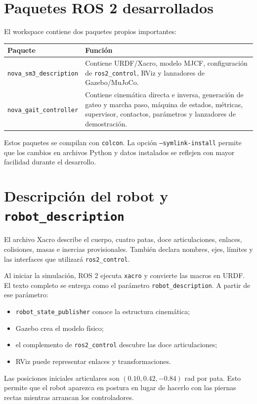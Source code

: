 \documentclass[11pt,a4paper]{article}
\begin{document}
\section{Paquetes ROS 2 desarrollados}
El workspace contiene dos paquetes propios importantes:
\begin{table}[h]
\centering
\begin{tabular}{p{}p{}}
\toprule
Paquete & Función\\
\midrule
\texttt{nova\_sm3\_description} & Contiene URDF/Xacro, modelo MJCF,
configuración de \texttt{ros2\_control}, RViz y lanzadores de Gazebo/MuJoCo.\\
\texttt{nova\_gait\_controller} & Contiene cinemática directa e inversa,
generación de gateo y marcha paso, máquina de estados, métricas, supervisor,
contactos, parámetros y lanzadores de demostración.\\
\bottomrule
\end{tabular}
\end{table}

Estos paquetes se compilan con \texttt{colcon}. La opción
\texttt{--symlink-install} permite que los cambios en archivos Python y datos
instalados se reflejen con mayor facilidad durante el desarrollo.

\section{Descripción del robot y \texttt{robot\_description}}
El archivo Xacro describe el cuerpo, cuatro patas, doce articulaciones, enlaces,
colisiones, masas e inercias provisionales. También declara nombres, ejes,
límites y las interfaces que utilizará \texttt{ros2\_control}.

Al iniciar la simulación, ROS 2 ejecuta \texttt{xacro} y convierte las macros en
URDF. El texto completo se entrega como el parámetro
\texttt{robot\_description}. A partir de ese parámetro:
\begin{itemize}
\item \texttt{robot\_state\_publisher} conoce la estructura cinemática;
\item Gazebo crea el modelo físico;
\item el complemento de \texttt{ros2\_control} descubre las doce articulaciones;
\item RViz puede representar enlaces y transformaciones.
\end{itemize}

Las posiciones iniciales articulares son
$(0.10,0.42,-0.84)$ rad por pata. Esto permite que el robot aparezca en postura
en lugar de hacerlo con las piernas rectas mientras arrancan los controladores.
\end{document}
